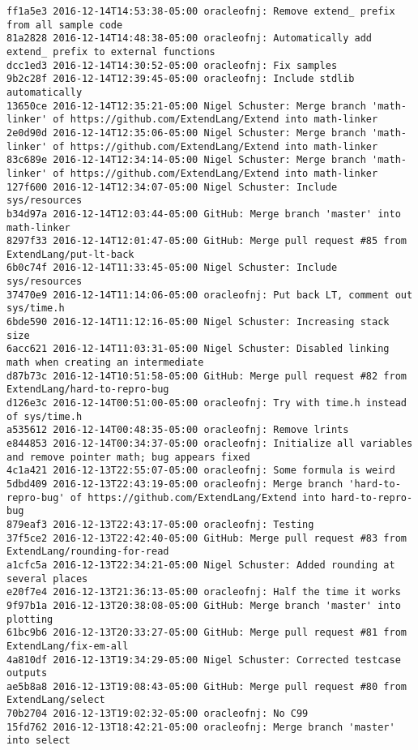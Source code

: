 \begin{lstlisting}
ff1a5e3 2016-12-14T14:53:38-05:00 oracleofnj: Remove extend_ prefix from all sample code
81a2828 2016-12-14T14:48:38-05:00 oracleofnj: Automatically add extend_ prefix to external functions
dcc1ed3 2016-12-14T14:30:52-05:00 oracleofnj: Fix samples
9b2c28f 2016-12-14T12:39:45-05:00 oracleofnj: Include stdlib automatically
13650ce 2016-12-14T12:35:21-05:00 Nigel Schuster: Merge branch 'math-linker' of https://github.com/ExtendLang/Extend into math-linker
2e0d90d 2016-12-14T12:35:06-05:00 Nigel Schuster: Merge branch 'math-linker' of https://github.com/ExtendLang/Extend into math-linker
83c689e 2016-12-14T12:34:14-05:00 Nigel Schuster: Merge branch 'math-linker' of https://github.com/ExtendLang/Extend into math-linker
127f600 2016-12-14T12:34:07-05:00 Nigel Schuster: Include sys/resources
b34d97a 2016-12-14T12:03:44-05:00 GitHub: Merge branch 'master' into math-linker
8297f33 2016-12-14T12:01:47-05:00 GitHub: Merge pull request #85 from ExtendLang/put-lt-back
6b0c74f 2016-12-14T11:33:45-05:00 Nigel Schuster: Include sys/resources
37470e9 2016-12-14T11:14:06-05:00 oracleofnj: Put back LT, comment out sys/time.h
6bde590 2016-12-14T11:12:16-05:00 Nigel Schuster: Increasing stack size
6acc621 2016-12-14T11:03:31-05:00 Nigel Schuster: Disabled linking math when creating an intermediate
d87b73c 2016-12-14T10:51:58-05:00 GitHub: Merge pull request #82 from ExtendLang/hard-to-repro-bug
d126e3c 2016-12-14T00:51:00-05:00 oracleofnj: Try with time.h instead of sys/time.h
a535612 2016-12-14T00:48:35-05:00 oracleofnj: Remove lrints
e844853 2016-12-14T00:34:37-05:00 oracleofnj: Initialize all variables and remove pointer math; bug appears fixed
4c1a421 2016-12-13T22:55:07-05:00 oracleofnj: Some formula is weird
5dbd409 2016-12-13T22:43:19-05:00 oracleofnj: Merge branch 'hard-to-repro-bug' of https://github.com/ExtendLang/Extend into hard-to-repro-bug
879eaf3 2016-12-13T22:43:17-05:00 oracleofnj: Testing
37f5ce2 2016-12-13T22:42:40-05:00 GitHub: Merge pull request #83 from ExtendLang/rounding-for-read
a1cfc5a 2016-12-13T22:34:21-05:00 Nigel Schuster: Added rounding at several places
e20f7e4 2016-12-13T21:36:13-05:00 oracleofnj: Half the time it works
9f97b1a 2016-12-13T20:38:08-05:00 GitHub: Merge branch 'master' into plotting
61bc9b6 2016-12-13T20:33:27-05:00 GitHub: Merge pull request #81 from ExtendLang/fix-em-all
4a810df 2016-12-13T19:34:29-05:00 Nigel Schuster: Corrected testcase outputs
ae5b8a8 2016-12-13T19:08:43-05:00 GitHub: Merge pull request #80 from ExtendLang/select
70b2704 2016-12-13T19:02:32-05:00 oracleofnj: No C99
15fd762 2016-12-13T18:42:21-05:00 oracleofnj: Merge branch 'master' into select

\end{lstlisting}
